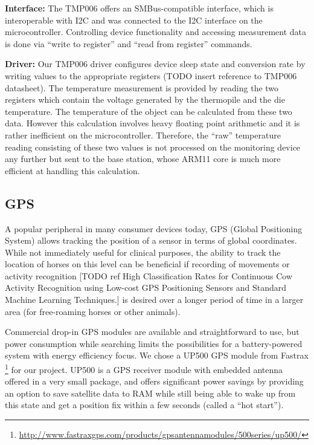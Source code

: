 \textbf{Interface:} The TMP006 offers an SMBus-compatible interface, which is interoperable with I2C and was connected to the I2C interface on the microcontroller. Controlling device functionality and accessing measurement data is done via “write to register” and “read from register” commands. 

\textbf{Driver:} Our TMP006 driver configures device sleep state and conversion rate by writing values to the appropriate registers (TODO insert reference to TMP006 datasheet). The temperature measurement is provided by reading the two registers which contain the voltage generated by the thermopile and the die temperature. The temperature of the object can be calculated from these two data. However this calculation involves heavy floating point arithmetic and it is rather inefficient on the microcontroller. Therefore, the “raw” temperature reading consisting of these two values is not processed on the monitoring device any further but sent to the base station, whose ARM11 core is much more efficient at handling this calculation. 


\subsection{GPS}
A popular peripheral in many consumer devices today, GPS (Global Positioning System) allows tracking the position of a sensor in terms of global coordinates. While not immediately useful for clinical purposes, the ability to track the location of horses on this level can be beneficial if recording of movements or activity recognition [TODO ref High Classification Rates for Continuous Cow Activity Recognition using Low-cost GPS Positioning Sensors and Standard Machine Learning Techniques.]  is desired over a longer period of time in a larger area (for free-roaming horses or other animals). 

Commercial drop-in GPS modules are available and straightforward to use, but power consumption while searching limits the possibilities for a battery-powered system with energy efficiency focus. We chose a UP500 GPS module from Fastrax \footnote{\url{http://www.fastraxgps.com/products/gpsantennamodules/500series/up500/}}
for our project. UP500 is a GPS receiver module with embedded antenna offered in a very small package, and offers significant power savings by providing an option to save satellite data to RAM while still being able to wake up from this state and get a position fix within a few seconds (called a “hot start”). 

